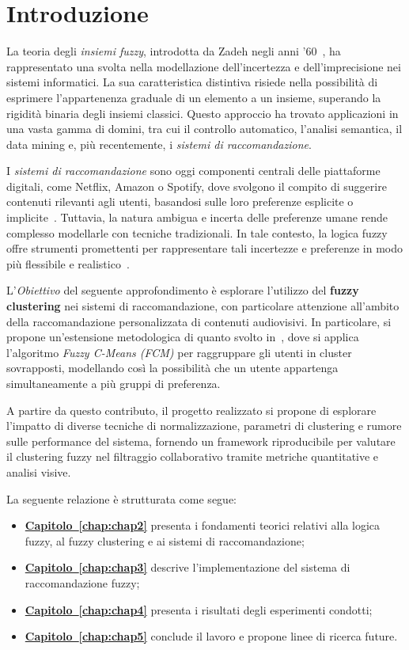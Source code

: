 \chapter{Introduzione}
\label{chap:chap1}

La teoria degli \emph{insiemi fuzzy}, introdotta da Zadeh negli anni ’60~\cite{Goguen_1973}, ha rappresentato una svolta nella modellazione dell’incertezza e dell’imprecisione nei sistemi informatici. La sua caratteristica distintiva risiede nella possibilità di esprimere l’appartenenza graduale di un elemento a un insieme, superando la rigidità binaria degli insiemi classici. Questo approccio ha trovato applicazioni in una vasta gamma di domini, tra cui il controllo automatico, l’analisi semantica, il data mining e, più recentemente, i \emph{sistemi di raccomandazione}.

I \emph{sistemi di raccomandazione} sono oggi componenti centrali delle piattaforme digitali, come Netflix, Amazon o Spotify, dove svolgono il compito di suggerire contenuti rilevanti agli utenti, basandosi sulle loro preferenze esplicite o implicite~\cite{554776b9726f44c582f01d870cefd26b}. Tuttavia, la natura ambigua e incerta delle preferenze umane rende complesso modellarle con tecniche tradizionali. In tale contesto, la logica fuzzy offre strumenti promettenti per rappresentare tali incertezze e preferenze in modo più flessibile e realistico~\cite{EKEL2006179}.

L'\emph{Obiettivo} del seguente approfondimento è esplorare l’utilizzo del \textbf{fuzzy clustering} nei sistemi di raccomandazione, con particolare attenzione all’ambito della raccomandazione personalizzata di contenuti audiovisivi. In particolare, si propone un’estensione metodologica di quanto svolto in~\cite{KOOHI2016134}, dove si applica l’algoritmo \emph{Fuzzy C-Means (FCM)} per raggruppare gli utenti in cluster sovrapposti, modellando così la possibilità che un utente appartenga simultaneamente a più gruppi di preferenza.

A partire da questo contributo, il progetto realizzato si propone di esplorare l’impatto di diverse tecniche di normalizzazione, parametri di clustering e rumore sulle performance del sistema, fornendo un framework riproducibile per valutare il clustering fuzzy nel filtraggio collaborativo tramite metriche quantitative e analisi visive.

La seguente relazione è strutturata come segue:

\begin{itemize}
    \item \textbf{\hyperref[chap:chap2]{Capitolo~\ref*{chap:chap2}}} presenta i fondamenti teorici relativi alla logica fuzzy, al fuzzy clustering e ai sistemi di raccomandazione;
    \item \textbf{\hyperref[chap:chap3]{Capitolo~\ref*{chap:chap3}}} descrive l'implementazione del sistema di raccomandazione fuzzy;
    \item \textbf{\hyperref[chap:chap4]{Capitolo~\ref*{chap:chap4}}} presenta i risultati degli esperimenti condotti;
    \item \textbf{\hyperref[chap:chap5]{Capitolo~\ref*{chap:chap5}}} conclude il lavoro e propone linee di ricerca future.
\end{itemize}

